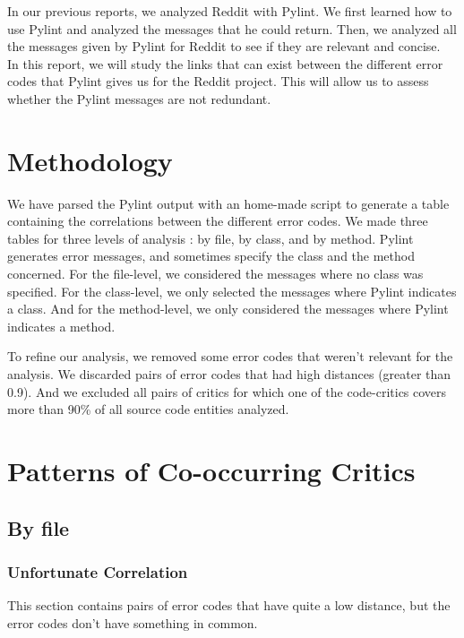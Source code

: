 \documentclass[12pt, a4paper]{article}
\newcommand{\pyl}{\textsf{Pylint}}
\begin{document}
In our previous reports, we analyzed Reddit with \pyl{}.
We first learned how to use \pyl{} and analyzed the messages that he could return.
Then, we analyzed all the messages given by \pyl{} for Reddit to see if they are relevant and concise.\\

In this report, we will study the links that can exist between the different error codes that \pyl{} gives us for the Reddit project.
This will allow us to assess whether the \pyl{} messages are not redundant.


\section{Methodology}

We have parsed the \pyl{} output with an home-made script to generate a table containing the correlations between the different error codes.
We made three tables for three levels of analysis : by file, by class, and by method.
\pyl{} generates error messages, and sometimes specify the class and the method concerned.
For the file-level, we considered the messages where no class was specified.
For the class-level, we only selected the messages where \pyl{} indicates a class.
And for the method-level, we only considered the messages where \pyl{} indicates a method.

\bigskip
To refine our analysis, we removed some error codes that weren't relevant for the analysis.
We discarded pairs of error codes that had high distances (greater than 0.9).
And we excluded all pairs of critics for which one of the code-critics covers more than 90\% of all source code entities analyzed.



\section{Patterns of Co-occurring Critics}

\subsection{By file}

\subsubsection*{Unfortunate Correlation}

This section contains pairs of error codes that have quite a low distance, but the error codes don't have something in common.
\end{document}
